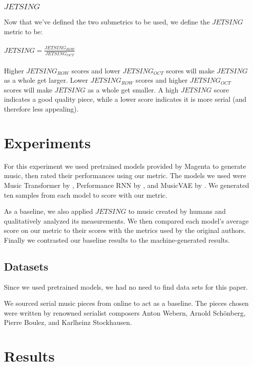 \documentclass[11pt]{article}
\begin{document}
\subsubsection{$JETSING$}
Now that we've defined the two submetrics to be used, we define the $JETSING$ metric to be:
\\ \\
\LARGE
$ JETSING = \frac{JETSING_{ROW}}{JETSING_{OCT}}$
\normalsize
\\ \\
\indent Higher $JETSING_{ROW}$ scores and lower $JETSING_{OCT}$ scores will make $JETSING$ as a whole get larger.
Lower $JETSING_{ROW}$ scores and higher $JETSING_{OCT}$ scores will make $JETSING$ as a whole get smaller.
A high $JETSING$ score indicates a good quality piece, while a lower score indicates it is more serial (and therefore less appealing).

\section{Experiments}
For this experiment we used pretrained models provided by Magenta to generate music, then rated their performances using our metric.
The models we used were Music Transformer by \cite{huang2018music}, Performance RNN by \cite{performance-rnn-2017}, and MusicVAE by \cite{musicVAE}.
We generated ten samples from each model to score with our metric.

As a baseline, we also applied $JETSING$ to music created by humans and qualitatively analyzed its measurements.
We then compared each model's average score on our metric to their scores with the metrics used by the original authors.
Finally we contrasted our baseline results to the machine-generated results.

\subsection{Datasets}
Since we used pretrained models, we had no need to find data sets for this paper.

We sourced serial music pieces from online to act as a baseline.
The pieces chosen were written by renowned serialist composers Anton Webern, Arnold Schönberg, Pierre Boulez, and  Karlheinz Stockhausen.

\section{Results}
\end{document}

